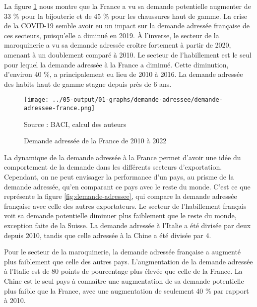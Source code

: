 \documentclass[french,10pt,a4paper]{article}
\begin{document}
La figure \ref{fig:demande-adressee-france} nous montre que la France a vu sa demande potentielle augmenter de 33 \% pour la bijouterie et de 45 \% pour les chaussures haut de gamme. La crise de la COVID-19 semble avoir eu un impact sur la demande adressée française de ces secteurs, puisqu'elle a diminué en 2019. À l'inverse, le secteur de la maroquinerie a vu sa demande adressée croître fortement à partir de 2020, amenant à un doublement comparé à 2010. Le secteur de l'habillement est le seul pour lequel la demande adressée à la France a diminué. Cette diminution, d'environ 40 \%, a principalement eu lieu de 2010 à 2016. La demande adressée des habits haut de gamme stagne depuis près de 6 ans.

\begin{figure}[!h]
  \centering  \texttt{[image: ../05-output/01-graphs/demande-adressee/demande-adressee-france.png]}
  \captionsetup{justification=raggedright,singlelinecheck=false, font=small}
  \caption*{Source : BACI, calcul des auteurs}
  \captionsetup{justification=centering, singlelinecheck=true, font=normalsize}
  \caption{Demande adressée de la France de 2010 à 2022}
  \label{fig:demande-adressee-france}
\end{figure}

La dynamique de la demande adressée à la France permet d'avoir une idée du comportement de la demande dans les différents secteurs d'exportation. Cependant, on ne peut envisager la performance d'un pays, au prisme de la demande adressée, qu'en comparant ce pays avec le reste du monde. C'est ce que représente la figure \ref{fig:demande-adressee}, qui compare la demande adressée française avec celle des autres exportateurs. Le secteur de l'habillement français voit sa demande potentielle diminuer plus faiblement que le reste du monde, exception faite de la Suisse. La demande adressée à l'Italie a été divisée par deux depuis 2010, tandis que celle adressée à la Chine a été divisée par 4.

Pour le secteur de la maroquinerie, la demande adressée française a augmenté plus faiblement que celle des autres pays. L'augmentation de la demande adressée à l'Italie est de 80 points de pourcentage plus élevée que celle de la France. La Chine est le seul pays à connaître une augmentation de sa demande potentielle plus faible que la France, avec une augmentation de seulement 40 \% par rapport à 2010.
\end{document}
